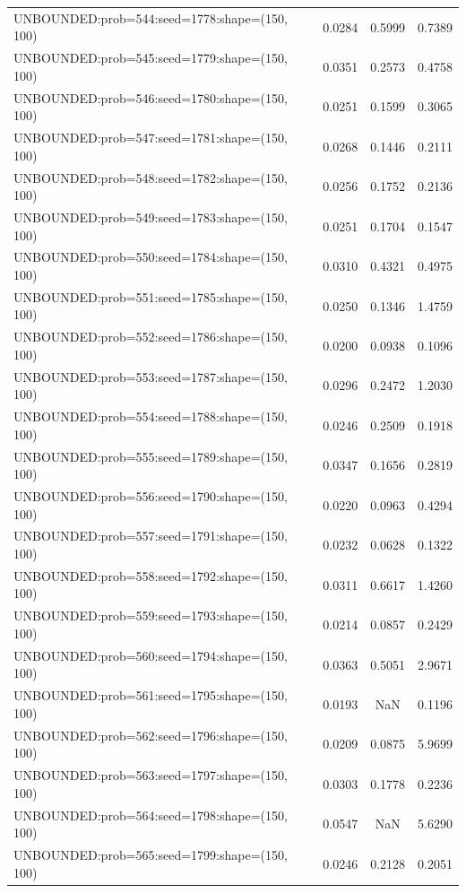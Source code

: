 \begin{longtable}{lccc}
UNBOUNDED:prob=544:seed=1778:shape=(150, 100) &   0.0284 &  0.5999 &  0.7389 \\
UNBOUNDED:prob=545:seed=1779:shape=(150, 100) &   0.0351 &  0.2573 &  0.4758 \\
UNBOUNDED:prob=546:seed=1780:shape=(150, 100) &   0.0251 &  0.1599 &  0.3065 \\
UNBOUNDED:prob=547:seed=1781:shape=(150, 100) &   0.0268 &  0.1446 &  0.2111 \\
UNBOUNDED:prob=548:seed=1782:shape=(150, 100) &   0.0256 &  0.1752 &  0.2136 \\
UNBOUNDED:prob=549:seed=1783:shape=(150, 100) &   0.0251 &  0.1704 &  0.1547 \\
UNBOUNDED:prob=550:seed=1784:shape=(150, 100) &   0.0310 &  0.4321 &  0.4975 \\
UNBOUNDED:prob=551:seed=1785:shape=(150, 100) &   0.0250 &  0.1346 &  1.4759 \\
UNBOUNDED:prob=552:seed=1786:shape=(150, 100) &   0.0200 &  0.0938 &  0.1096 \\
UNBOUNDED:prob=553:seed=1787:shape=(150, 100) &   0.0296 &  0.2472 &  1.2030 \\
UNBOUNDED:prob=554:seed=1788:shape=(150, 100) &   0.0246 &  0.2509 &  0.1918 \\
UNBOUNDED:prob=555:seed=1789:shape=(150, 100) &   0.0347 &  0.1656 &  0.2819 \\
UNBOUNDED:prob=556:seed=1790:shape=(150, 100) &   0.0220 &  0.0963 &  0.4294 \\
UNBOUNDED:prob=557:seed=1791:shape=(150, 100) &   0.0232 &  0.0628 &  0.1322 \\
UNBOUNDED:prob=558:seed=1792:shape=(150, 100) &   0.0311 &  0.6617 &  1.4260 \\
UNBOUNDED:prob=559:seed=1793:shape=(150, 100) &   0.0214 &  0.0857 &  0.2429 \\
UNBOUNDED:prob=560:seed=1794:shape=(150, 100) &   0.0363 &  0.5051 &  2.9671 \\
UNBOUNDED:prob=561:seed=1795:shape=(150, 100) &   0.0193 &     NaN &  0.1196 \\
UNBOUNDED:prob=562:seed=1796:shape=(150, 100) &   0.0209 &  0.0875 &  5.9699 \\
UNBOUNDED:prob=563:seed=1797:shape=(150, 100) &   0.0303 &  0.1778 &  0.2236 \\
UNBOUNDED:prob=564:seed=1798:shape=(150, 100) &   0.0547 &     NaN &  5.6290 \\
UNBOUNDED:prob=565:seed=1799:shape=(150, 100) &   0.0246 &  0.2128 &  0.2051 \\

\end{longtable}
